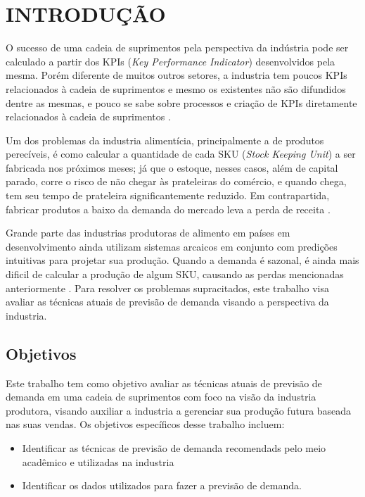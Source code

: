 
\chapter{INTRODUÇÃO}


O sucesso de uma cadeia de suprimentos pela perspectiva da indústria pode ser calculado a partir dos KPIs (\textit{Key Performance Indicator}) desenvolvidos pela mesma. Porém diferente de muitos outros setores, a industria tem poucos KPIs relacionados à cadeia de suprimentos e mesmo os existentes não são difundidos dentre as mesmas, e pouco se sabe sobre processos e criação de KPIs diretamente relacionados à cadeia de suprimentos \cite{chae2009developing}.

Um dos problemas da industria alimentícia, principalmente a de produtos perecíveis, é como calcular a quantidade de cada SKU (\textit{Stock Keeping Unit}) a ser fabricada nos próximos meses; já que o estoque, nesses casos,  além de capital parado, corre o risco de não chegar às prateleiras do comércio, e quando chega, tem seu tempo de prateleira significantemente reduzido. Em contrapartida, fabricar produtos a baixo da demanda do mercado leva a perda de receita \cite{aburto2007improved}.

Grande parte das industrias produtoras de alimento em países em desenvolvimento ainda utilizam sistemas arcaicos em conjunto com predições intuitivas para projetar sua produção. Quando a demanda é sazonal, é ainda mais dificil de calcular a produção de algum SKU, causando as perdas mencionadas anteriormente \cite{yenradee2001demand}. Para resolver os problemas supracitados, este trabalho visa avaliar as técnicas atuais de previsão de demanda visando a perspectiva da industria.

\section{Objetivos}
Este trabalho tem como objetivo avaliar as técnicas atuais de previsão de demanda em uma cadeia de suprimentos com foco na visão da industria produtora, visando auxiliar a industria a gerenciar sua produção futura baseada nas suas vendas.
Os objetivos específicos desse trabalho incluem:
\begin{itemize}
\item{Identificar as técnicas de previsão de demanda recomendads pelo meio acadêmico e utilizadas na industria}
\item{Identificar os dados utilizados para fazer a previsão de demanda.}
\end{itemize}

